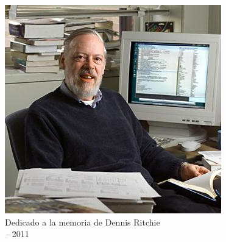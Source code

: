 \thispagestyle{empty}
{}

\vspace*{3cm}

\begin{center}
	\includegraphics{gfx/dennis_ritchie6} \\ \smallskip
    Dedicado a la memoria de Dennis Ritchie \\ \,--\,2011
\end{center}